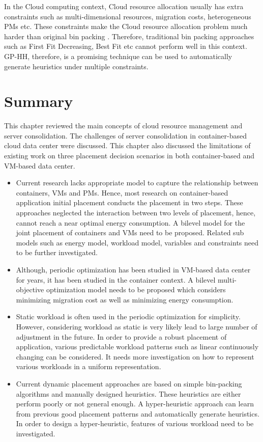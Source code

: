 In the Cloud computing context,  Cloud resource allocation usually has extra constraints such as multi-dimensional resources, migration costs, heterogeneous PMs etc. These constraints make the Cloud resource allocation problem much harder than original bin packing \cite{Mann:2015ua}. Therefore, traditional bin packing approaches such as First Fit Decreasing, Best Fit etc cannot perform well in this context.  GP-HH, therefore, is a promising technique can be used to automatically generate heuristics under multiple constraints.


\section{Summary}

This chapter reviewed the main concepts of cloud resource management and server consolidation. The challenges of server consolidation in container-based cloud data center were discussed. This chapter also discussed the limitations of existing work on three placement decision scenarios in both container-based and VM-based data center. 

\begin{itemize}
	\item Current research lacks appropriate model to capture the relationship between containers, VMs and PMs. Hence, most research on container-based application initial placement conducts the placement in two steps. These approaches neglected the interaction between two levels of placement, hence, cannot reach a near optimal energy consumption. A bilevel model for the joint placement of containers and VMs need to be proposed. Related sub models such as energy model, workload model, variables and constraints need to be further investigated.
	\item Although, periodic optimization has been studied in VM-based data center for years, it has been studied in the container context. A bilevel multi-objective optimization model needs to be proposed which considers minimizing migration cost as well as minimizing energy consumption.
	\item Static workload is often used in the periodic optimization for simplicity. However, considering workload as static is very likely lead to large number of adjustment in the future. In order to provide a robust placement of application, various predictable workload patterns such as linear continuously changing can be considered. It needs more investigation on how to represent various workloads in a uniform representation. 
	\item Current dynamic placement approaches are based on simple bin-packing algorithms and manually designed heuristics. These heuristics are either perform poorly or not general enough. A hyper-heuristic approach can learn from previous good placement patterns and automatically generate heuristics. In order to design a hyper-heuristic, features of various workload need to be investigated. 
\end{itemize}


